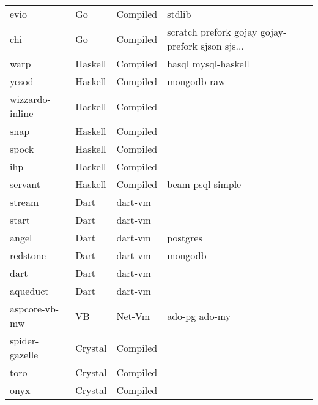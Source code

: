 \begin{longtable}{llll}
    evio             & Go & Compiled         & stdlib                                             \\
    chi              & Go & Compiled         & scratch prefork gojay gojay-prefork sjson sjs...   \\
    warp             & Haskell & Compiled    & hasql mysql-haskell                                \\
    yesod            & Haskell & Compiled    & mongodb-raw                                        \\
    wizzardo-inline  & Haskell & Compiled    &                                                    \\
    snap             & Haskell & Compiled    &                                                    \\
    spock            & Haskell & Compiled    &                                                    \\
    ihp              & Haskell & Compiled    &                                                    \\
    servant          & Haskell & Compiled    & beam psql-simple                                   \\
    stream           & Dart & dart-vm        &                                                    \\
    start            & Dart & dart-vm        &                                                    \\
    angel            & Dart & dart-vm        & postgres                                           \\
    redstone         & Dart & dart-vm        & mongodb                                            \\
    dart             & Dart & dart-vm        &                                                    \\
    aqueduct         & Dart & dart-vm        &                                                    \\
    aspcore-vb-mw    & VB & Net-Vm         & ado-pg ado-my                                      \\
    spider-gazelle   & Crystal & Compiled     &                                                    \\
    toro             & Crystal & Compiled     &                                                    \\
    onyx             & Crystal & Compiled     &                                                    \\

\end{longtable}
